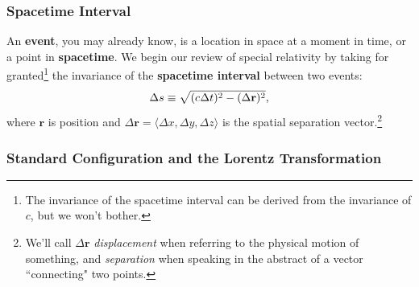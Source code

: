 \documentclass[12pt]{article}
\renewcommand{\vv}[1]{\mathbf{#1}}
\begin{document}
\subsubsection{Spacetime Interval}

An \textbf{event}, you may already know, is a location in space at a moment in time, or a point in \textbf{spacetime}. We begin our review of special relativity by taking for granted\footnote{The invariance of the spacetime interval can be derived from the invariance of $c$, but we won't bother.} the invariance of the \textbf{spacetime interval} between two events:
\begin{equation}\label{eq:sti}
\Delta s \equiv \sqrt{ (c \mkern.5mu \Delta t)^2 - ( \Delta \vv r )^2 } ,
\end{equation}
where $\vv r$ is position and ${\Delta \vv r = \langle \Delta x, \Delta y, \Delta z \rangle}$ is the spatial separation vector.\footnote{We'll call $\Delta \vv r$ \emph{displacement} when referring to the physical motion of something, and \emph{separation} when speaking in the abstract of a vector ``connecting" two points.}


\subsubsection{Standard Configuration and the Lorentz Transformation}\label{sssec:lt}
\end{document}
